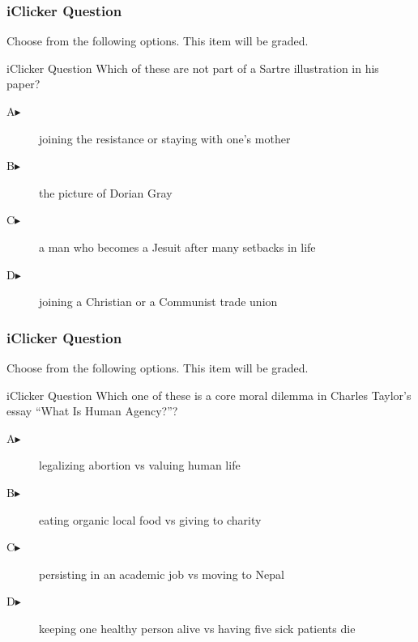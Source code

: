 \documentclass[xcolor=dvipsnames]{beamer}
\begin{document}
\begin{frame}
  \frametitle{iClicker Question}
Choose from the following options. This item will be graded.
\begin{block}{iClicker Question}
Which of these are not part of a Sartre illustration in his paper?
\end{block}
\begin{description}
\item[A\hspace{.2in}$\blacktriangleright$] joining the resistance or staying with one's mother
\item[B\hspace{.2in}$\blacktriangleright$] the picture of Dorian Gray
\item[C\hspace{.2in}$\blacktriangleright$] a man who becomes a Jesuit after many setbacks in life
\item[D\hspace{.2in}$\blacktriangleright$] joining a Christian or a Communist trade union
\end{description}
\end{frame}

\begin{frame}
  \frametitle{iClicker Question}
Choose from the following options. This item will be graded.
\begin{block}{iClicker Question}
Which one of these is a core moral dilemma in Charles Taylor's essay
``What Is Human Agency?''?
\end{block}
\begin{description}
\item[A\hspace{.2in}$\blacktriangleright$] legalizing abortion vs valuing human life
\item[B\hspace{.2in}$\blacktriangleright$] eating organic local food vs giving to charity
\item[C\hspace{.2in}$\blacktriangleright$] persisting in an academic job vs moving to Nepal
\item[D\hspace{.2in}$\blacktriangleright$] keeping one healthy person alive vs having five sick patients die
\end{description}
\end{frame}
\end{document}
